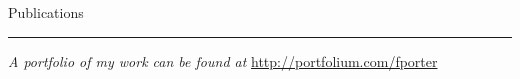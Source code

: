 \documentclass[12pt, oneside]{article}
\newcommand{\headingstyleJobs}[1] {
	{\fontsize{19pt}{1em}\selectfont \textcolor{new_red}{\textsf{#1}}}
	\textcolor{new_red}{\rule{3.25in}{0.5pt}} \vspace{3pt}
}
\newcommand{\jobtitle}[3] {
	{\bf #1} {#2} · {#3} \vspace{-10pt} \\
}
\begin{document}
\begin{flushleft}



\headingstyleJobs{Publications}

\vspace{-9pt}
\nocite{OWMS-DSA}




\textit{A portfolio of my work can be found at} \url{http://portfolium.com/fporter}

\end{flushleft}
\end{document}

